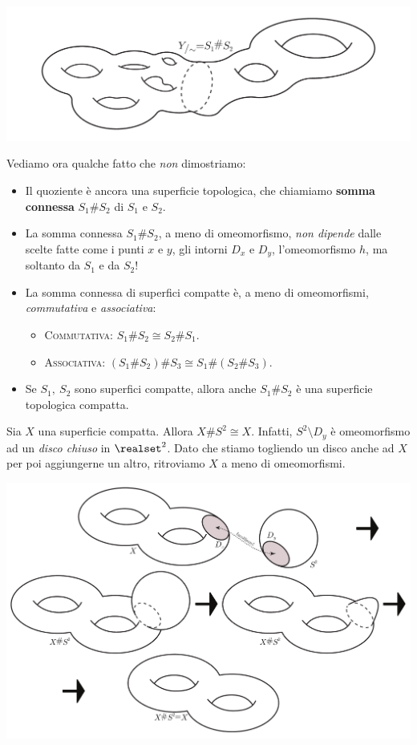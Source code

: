 \begin{center}
	\includegraphics[trim=0cm 0cm 0cm 0cm, clip, scale=0.4]{images/connectedsum3.pdf}
\end{center}
Vediamo ora qualche fatto che \textit{non} dimostriamo:
	\begin{itemize}
		\item Il quoziente è ancora una superficie topologica, che chiamiamo \textbf{somma connessa} $S_1\# S_2$  di $S_1$ e $S_2$. 
		\item La somma connessa $S_1\# S_2$, a meno di omeomorfismo, \textit{non dipende} dalle scelte fatte come i punti $x$ e $y$, gli intorni $D_x$ e $D_y$, l'omeomorfismo $h$, ma soltanto da $S_1$ e da $S_2$!
		\item La somma connessa di superfici compatte è, a meno di omeomorfismi, \textit{commutativa} e \textit{associativa}:
		\begin{itemize}
			\item \textsc{Commutativa}: $S_1\# S_2\cong S_2\# S_1$.
			\item \textsc{Associativa}: $\left(S_1\# S_2\right)\# S_3\cong S_1\#\left(S_2\# S_3\right)$.
		\end{itemize}
	\item Se $S_1,\ S_2$ sono superfici compatte, allora anche $S_1\# S_2$ è una superficie topologica compatta.
	\end{itemize}
\begin{observe}
	Sia $X$ una superficie compatta. Allora $X\# S^2\cong X$. Infatti, $S^2\setminus D_y$ è omeomorfismo ad un \textit{disco chiuso} in $\realset^2$. Dato che stiamo togliendo un disco anche ad $X$ per poi aggiungerne un altro, ritroviamo $X$ a meno di omeomorfismi.
	\begin{center}
		\includegraphics[trim=0cm 0cm 0cm 0cm, clip, scale=0.4]{images/connectedsumsphere.pdf}
	\end{center}
\end{observe}
